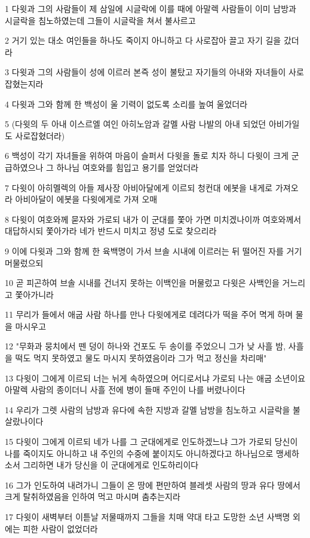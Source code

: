 \par 1 다윗과 그의 사람들이 제 삼일에 시글락에 이를 때에 아말렉 사람들이 이미 남방과 시글락을 침노하였는데 그들이 시글락을 쳐서 불사르고
\par 2 거기 있는 대소 여인들을 하나도 죽이지 아니하고 다 사로잡아 끌고 자기 길을 갔더라
\par 3 다윗과 그의 사람들이 성에 이르러 본즉 성이 불탔고 자기들의 아내와 자녀들이 사로잡혔는지라
\par 4 다윗과 그와 함께 한 백성이 울 기력이 없도록 소리를 높여 울었더라
\par 5 (다윗의 두 아내 이스르엘 여인 아히노암과 갈멜 사람 나발의 아내 되었던 아비가일도 사로잡혔더라)
\par 6 백성이 각기 자녀들을 위하여 마음이 슬퍼서 다윗을 돌로 치자 하니 다윗이 크게 군급하였으나 그 하나님 여호와를 힘입고 용기를 얻었더라
\par 7 다윗이 아히멜렉의 아들 제사장 아비아달에게 이르되 청컨대 에봇을 내게로 가져오라 아비아달이 에봇을 다윗에게로 가져 오매
\par 8 다윗이 여호와께 묻자와 가로되 내가 이 군대를 쫓아 가면 미치겠나이까 여호와께서 대답하시되 쫓아가라 네가 반드시 미치고 정녕 도로 찾으리라
\par 9 이에 다윗과 그와 함께 한 육백명이 가서 브솔 시내에 이르러는 뒤 떨어진 자를 거기 머물렀으되
\par 10 곧 피곤하여 브솔 시내를 건너지 못하는 이백인을 머물렀고 다윗은 사백인을 거느리고 쫓아가니라
\par 11 무리가 들에서 애굽 사람 하나를 만나 다윗에게로 데려다가 떡을 주어 멱게 하며 물을 마시우고
\par 12 "무화과 뭉치에서 뗀 덩이 하나와 건포도 두 송이를 주었으니 그가 낮 사흘 밤, 사흘을 떡도 먹지 못하였고 물도 마시지 못하였음이라 그가 먹고 정신을 차리매"
\par 13 다윗이 그에게 이르되 너는 뉘게 속하였으며 어디로서냐 가로되 나는 애굽 소년이요 아말렉 사람의 종이더니 사흘 전에 병이 들매 주인이 나를 버렸나이다
\par 14 우리가 그렛 사람의 남방과 유다에 속한 지방과 갈멜 남방을 침노하고 시글락을 불살랐나이다
\par 15 다윗이 그에게 이르되 네가 나를 그 군대에게로 인도하겠느냐 그가 가로되 당신이 나를 죽이지도 아니하고 내 주인의 수중에 붙이지도 아니하겠다고 하나님으로 맹세하소서 그리하면 내가 당신을 이 군대에게로 인도하리이다
\par 16 그가 인도하여 내려가니 그들이 온 땅에 편만하여 블레셋 사람의 땅과 유다 땅에서 크게 탈취하였음을 인하여 먹고 마시며 춤추는지라
\par 17 다윗이 새벽부터 이튿날 저물때까지 그들을 치매 약대 타고 도망한 소년 사백명 외에는 피한 사람이 없었더라
